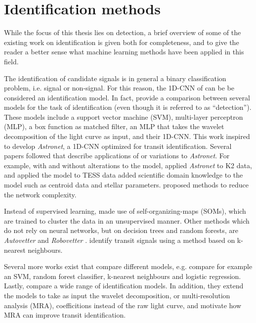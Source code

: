 
\section{Identification methods}

While the focus of this thesis lies on detection, a brief overview of some of the existing work on identification is given both for completeness, and to give the reader a better sense what machine learning methods have been applied in this field. 

The identification of candidate signals is in general a binary classification problem, i.e. signal or non-signal. For this reason, the 1D-CNN of \cite{pearson2018searching} can be be considered an identification model. In fact, \cite{pearson2018searching} provide a comparison between several models for the task of identification (even though it is referred to as ``detection''). These models include a support vector machine (SVM), multi-layer perceptron (MLP), a box function as matched filter, an MLP that takes the wavelet decomposition of the light curve as input, and their 1D-CNN. This work inspired \cite{shallue2018identifying} to develop \textit{Astronet}, a 1D-CNN optimized for transit identification. Several papers followed that describe applications of or variations to \textit{Astronet}. For example, with and without alterations to the model, \cite{dattilo2019identifying} applied \textit{Astronet} to K2 data, \cite{osborn2020rapid} and \cite{yu2019identifying} applied the model to TESS data \cite{ansdell2018scientific} added scientific domain knowledge to the model such as centroid data and stellar parameters. \cite{koning2019reducing} proposed methods to reduce the network complexity. 

Instead of supervised learning, \cite{armstrong2016transit} made use of self-organizing-maps (SOMs), which are trained to cluster the data in an unsupervised manner. Other methods which do not rely on neural networks, but on decision trees and random forests, are \textit{Autovetter} and \textit{Robovetter} \citep{catanzarite2015autovetter, coughlin2017planet}. \cite{thompson2015machine} identify transit signals using a method based on k-nearest neighbours.

Several more works exist that compare different models, e.g. \cite{schanche2019machine} compare for example an SVM, random forest classifier, k-nearest neighbours and logistic regression. Lastly, \cite{jaratransiting} compare a wide range of identification models. In addition, they extend the models to take as input the wavelet decomposition, or multi-resolution analysis (MRA), coefficitions instead of the raw light curve, and motivate how MRA can improve transit identification.